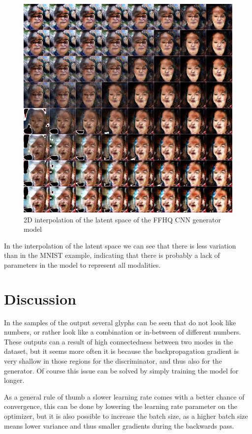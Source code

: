 \begin{figure}
    \centering
    \includegraphics[width=\linewidth]{media/ffhq_cnn_interp}
    \caption{2D interpolation of the latent space of the FFHQ CNN generator model}
    \label{fig:ffhq_cnn_interp}
\end{figure}

In the interpolation of the latent space we can see that there is less variation than in the
MNIST example, indicating that there is probably a lack of parameters in the model to represent
all modalities.


\section{Discussion}\label{sec:discussion}
In the samples of the output several glyphs can be seen that do not look like numbers, or rather
look like a combination or in-between of different numbers.
These outputs can a result of high connectedness between two modes in the dataset, but it seems
more often it is because the backpropagation gradient is very shallow in those regions for the
discriminator, and thus also for the generator.
Of course this issue can be solved by simply training the model for longer.

As a general rule of thumb a slower learning rate comes with a better chance of convergence, this
can be done by lowering the learning rate parameter on the optimizer, but it is also possible to
increase the batch size, as a higher batch size means lower variance and thus smaller gradients
during the backwards pass.

